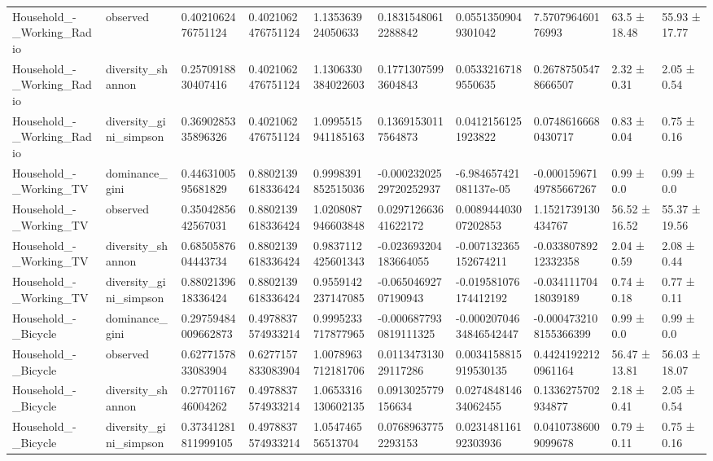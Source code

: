 \begin{longtable}{llllllllll}
Household\_-\_Working\_Radio & observed & 0.4021062476751124 & 0.4021062476751124 & 1.135363924050633 & 0.18315480612288842 & 0.05513509049301042 & 7.570796460176993 & 63.5 ± 18.48 & 55.93 ± 17.77 \\
Household\_-\_Working\_Radio & diversity\_shannon & 0.2570918830407416 & 0.4021062476751124 & 1.1306330384022603 & 0.17713075993604843 & 0.05332167189550635 & 0.26787505478666507 & 2.32 ± 0.31 & 2.05 ± 0.54 \\
Household\_-\_Working\_Radio & diversity\_gini\_simpson & 0.3690285335896326 & 0.4021062476751124 & 1.0995515941185163 & 0.13691530117564873 & 0.04121561251923822 & 0.07486166680430717 & 0.83 ± 0.04 & 0.75 ± 0.16 \\
Household\_-\_Working\_TV & dominance\_gini & 0.4463100595681829 & 0.8802139618336424 & 0.9998391852515036 & -0.00023202529720252937 & -6.984657421081137e-05 & -0.00015967149785667267 & 0.99 ± 0.0 & 0.99 ± 0.0 \\
Household\_-\_Working\_TV & observed & 0.3504285642567031 & 0.8802139618336424 & 1.0208087946603848 & 0.029712663641622172 & 0.008944403007202853 & 1.1521739130434767 & 56.52 ± 16.52 & 55.37 ± 19.56 \\
Household\_-\_Working\_TV & diversity\_shannon & 0.6850587604443734 & 0.8802139618336424 & 0.9837112425601343 & -0.023693204183664055 & -0.007132365152674211 & -0.03380789212332358 & 2.04 ± 0.59 & 2.08 ± 0.44 \\
Household\_-\_Working\_TV & diversity\_gini\_simpson & 0.8802139618336424 & 0.8802139618336424 & 0.9559142237147085 & -0.06504692707190943 & -0.019581076174412192 & -0.03411170418039189 & 0.74 ± 0.18 & 0.77 ± 0.11 \\
Household\_-\_Bicycle & dominance\_gini & 0.29759484009662873 & 0.4978837574933214 & 0.9995233717877965 & -0.0006877930819111325 & -0.00020704634846542447 & -0.0004732108155366399 & 0.99 ± 0.0 & 0.99 ± 0.0 \\
Household\_-\_Bicycle & observed & 0.6277157833083904 & 0.6277157833083904 & 1.0078963712181706 & 0.011347313029117286 & 0.0034158815919530135 & 0.44241922120961164 & 56.47 ± 13.81 & 56.03 ± 18.07 \\
Household\_-\_Bicycle & diversity\_shannon & 0.2770116746004262 & 0.4978837574933214 & 1.0653316130602135 & 0.0913025779156634 & 0.027484814634062455 & 0.1336275702934877 & 2.18 ± 0.41 & 2.05 ± 0.54 \\
Household\_-\_Bicycle & diversity\_gini\_simpson & 0.37341281811999105 & 0.4978837574933214 & 1.054746556513704 & 0.07689637752293153 & 0.023148116192303936 & 0.04107386009099678 & 0.79 ± 0.11 & 0.75 ± 0.16 \\

\end{longtable}
